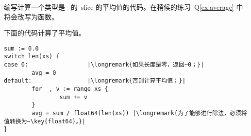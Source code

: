 \begin{Exercise}[title={Average},difficulty=1]
\label{ex:average no func}
\Question\label{ex:average no func q1} 编写计算一个类型是~
 的~slice 的平均值的代码。在稍候的练习~Q\ref{ex:average} 
中将会改写为函数。
\end{Exercise}

\begin{Answer}
\Question 下面的代码计算了平均值。
\begin{lstlisting}
sum := 0.0 
switch len(xs) {
case 0:                 |\longremark{如果长度是零，返回~0；}|
        avg = 0
default:                |\longremark{否则计算平均值；}|
        for _, v := range xs {
                sum += v
        }
        avg = sum / float64(len(xs)) |\longremark{为了能够进行除法，必须将值转换为~\key{float64}。}|
}
\end{lstlisting}
\showremarks
\end{Answer}
